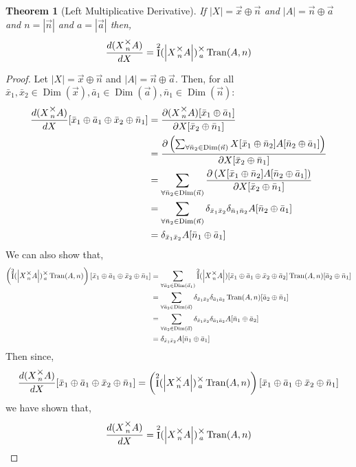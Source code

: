 \documentclass[12pt]{book}
\theoremstyle{plain}
\newtheorem{theorem}{Theorem}[chapter]
\theoremstyle{definition}
\theoremstyle{ppart}
\theoremstyle{case}
\theoremstyle{solution}
\DeclareMathOperator{\Dim}{Dim}
\DeclareMathOperator{\Ident}{I}
\DeclareMathOperator{\Tran}{Tran}
\newcommand{\mmult}[1]{\text{\raisebox{1ex}{$\underset{#1}{\times}$}}}
\newcommand{\shape}[1]{\left|#1\right|}
\begin{document}
\begin{landscape}
\begin{theorem}[Left Multiplicative Derivative]
\label{left_mult_derivative}
If $\shape{X} = \vec{x} \oplus \vec{n}$ and $\shape{A} = \vec{n} \oplus \vec{a}$
and $n = \shape{\vec{n}}$ and $a = \shape{\vec{a}}$ then,
\[ \frac{d(X \mmult{n} A)}{dX} = \Ident^2(\shape{X \mmult{n} A}) \mmult{a} \Tran(A, n) \]
\end{theorem}
\begin{proof}
Let $\shape{X} = \vec{x} \oplus \vec{n}$ and $\shape{A} = \vec{n} \oplus \vec{a}$. Then,
for all
$\bar{x}_1, \bar{x}_2 \in \Dim(\vec{x}), \bar{a}_1 \in \Dim(\vec{a}),
\bar{n}_1 \in \Dim(\vec{n}):$
\begin{align*}
	\frac{d(X \mmult{n} A)}{dX}
	[\bar{x}_1 \oplus \bar{a}_1 \oplus \bar{x}_2 \oplus \bar{n}_1]
	&= 
	\frac{
		\partial (X \mmult{n} A) [\bar{x}_1 \oplus \bar{a}_1]
	}{\partial X[\bar{x}_2 \oplus \bar{n}_1]} \\
	&= 
	\frac{
		\partial \left(
			\sum_{\forall \bar{n}_2 \in \Dim(\vec{n})}
			X[\bar{x}_1 \oplus \bar{n}_2] A[\bar{n}_2 \oplus \bar{a}_1]
		\right)
	}{\partial X[\bar{x}_2 \oplus \bar{n}_1]} \\
	&= 
	\sum_{\forall \bar{n}_2 \in \Dim(\vec{n})}
	\frac{
		\partial \left(
			X[\bar{x}_1 \oplus \bar{n}_2] A[\bar{n}_2 \oplus \bar{a}_1]
		\right)
	}{\partial X[\bar{x}_2 \oplus \bar{n}_1]} \\
	&= 
	\sum_{\forall \bar{n}_2 \in \Dim(\vec{n})}
	\delta_{\bar{x}_1\bar{x}_2}
	\delta_{\bar{n}_1\bar{n}_2}
	A[\bar{n}_2 \oplus \bar{a}_1] \\
	&= 
	\delta_{\bar{x}_1\bar{x}_2}
	A[\bar{n}_1 \oplus \bar{a}_1]
\end{align*}
We can also show that,
\begin{align*}
	\left(\Ident^2(\shape{X \mmult{n} A}) \mmult{a} \Tran(A, n)\right)
	[\bar{x}_1 \oplus \bar{a}_1 \oplus \bar{x}_2 \oplus \bar{n}_1]
	&=
	\sum_{\forall \bar{a}_2 \in \Dim(\vec{a}_1)}
	\Ident^2(\shape{X \mmult{n} A})[\bar{x}_1 \oplus \bar{a}_1 \oplus \bar{x}_2 \oplus \bar{a}_2]
	\Tran(A, n)[\bar{a}_2 \oplus \bar{n}_1] \\
	&=
	\sum_{\forall \bar{a}_2 \in \Dim(\vec{a})}
	\delta_{\bar{x}_1 \bar{x}_2} \delta_{\bar{a}_1 \bar{a}_2}
	\Tran(A, n)[\bar{a}_2 \oplus \bar{n}_1] \\
	&=
	\sum_{\forall \bar{a}_2 \in \Dim(\vec{a})}
	\delta_{\bar{x}_1 \bar{x}_2} \delta_{\bar{a}_1 \bar{a}_2}
	A[\bar{n}_1 \oplus \bar{a}_2] \\
	&=
	\delta_{\bar{x}_1 \bar{x}_2}
	A[\bar{n}_1 \oplus \bar{a}_1]
\end{align*}
Then since,
\[
	\frac{d(X \mmult{n} A)}{dX}
	[\bar{x}_1 \oplus \bar{a}_1 \oplus \bar{x}_2 \oplus \bar{n}_1]
	=
	\left(\Ident^2(\shape{X \mmult{n} A}) \mmult{a} \Tran(A, n)\right)
	[\bar{x}_1 \oplus \bar{a}_1 \oplus \bar{x}_2 \oplus \bar{n}_1]
\]
we have shown that,
\[
	\frac{d(X \mmult{n} A)}{dX}
	=
	\Ident^2(\shape{X \mmult{n} A}) \mmult{a} \Tran(A, n)
\]
\end{proof}
\end{landscape}
\end{document}

